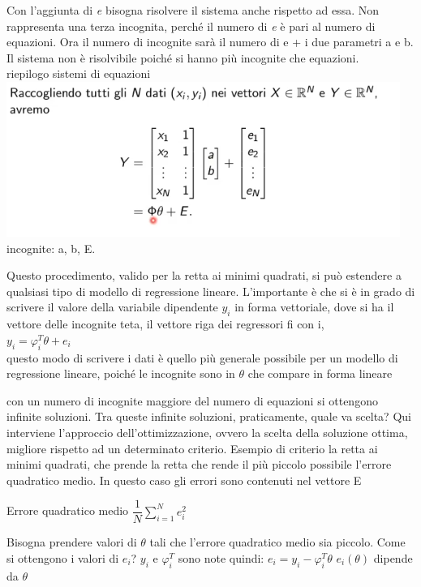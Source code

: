 \documentclass[10pt,a4paper]{article}
\begin{document}
Con l'aggiunta di \textit{e} bisogna risolvere il sistema anche rispetto ad essa. Non rappresenta una terza incognita, perché il numero di \textit{e} è pari al numero di equazioni.
Ora il numero di incognite sarà il numero di e + i due parametri a e b. Il sistema non è risolvibile poiché si hanno più incognite che equazioni.\\

riepilogo sistemi di equazioni \\

\includegraphics[scale=0.61]{matri.png} 
incognite: a, b, E.

Questo procedimento, valido per la retta ai minimi quadrati, si può estendere a qualsiasi tipo di modello di regressione lineare. L'importante è che si è in grado di scrivere il valore della variabile dipendente $ y_{i} $ in forma vettoriale, dove si ha il vettore delle incognite teta, il vettore riga dei regressori fi con i, \\
$ y_{i}=\varphi_{i}^{T} \theta+e_{i} $\\
questo modo di scrivere i dati è quello più generale possibile per un modello di regressione lineare, poiché le incognite sono in $ \theta $ che compare in forma lineare

con un numero di incognite maggiore del numero di equazioni si ottengono infinite soluzioni. Tra queste infinite soluzioni, praticamente, quale va scelta?
Qui interviene l'approccio dell'ottimizzazione, ovvero la scelta della soluzione ottima, migliore rispetto ad un determinato criterio. Esempio di criterio la retta ai minimi quadrati, che prende la retta che rende il più piccolo possibile l'errore quadratico medio. In questo caso gli errori sono contenuti nel vettore E

Errore quadratico medio $ \dfrac{1}{N} \sum_{i=1}^N e_{i}^{2} $

Bisogna prendere valori di $ \theta $ tali che l'errore quadratico medio sia piccolo.
Come si ottengono i valori di $e_{i}$?
$y_{i}$ e $ \varphi_{i}^{T} $ sono note quindi: $ e_{i}=y_{i}-\varphi_{i}^{T} \theta $
$ e_{i}(\theta) $ dipende da $ \theta $
\end{document}
